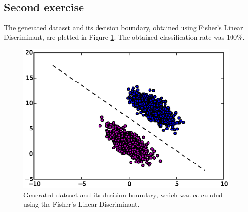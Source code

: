 \documentclass[a4paper,10pt]{article}
\begin{document}
\cleardoublepage
\subsection*{Second exercise}
The generated dataset and its decision boundary, obtained using Fisher's Linear Discriminant, are plotted in Figure \ref{fig:2f1}. The obtained classification rate was 100\%.
\begin{figure}[htb]
 \centering
 \includegraphics[scale=0.7]{./figures/2f2.eps}
 \caption{Generated dataset and its decision boundary, which was calculated using the Fisher's Linear Discriminant.}
 \label{fig:2f1}
\end{figure}

\cleardoublepage
\end{document}
